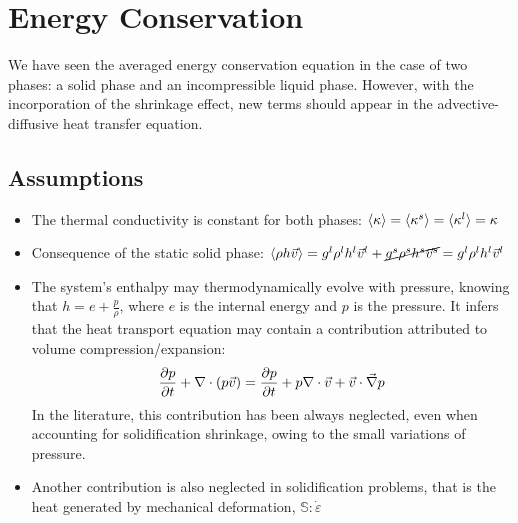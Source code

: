 \section{Energy Conservation}
We have seen the averaged energy conservation equation in the case of two phases: a solid phase and an incompressible liquid phase. However, with the incorporation of the shrinkage effect, new terms should appear
in the advective-diffusive heat transfer equation. 

\subsection{Assumptions}
\begin{itemize}
\item The thermal conductivity is constant for both phases: $\langle \kappa \rangle = \langle \kappa^s \rangle = \langle \kappa^l \rangle= \kappa $ 
\item Consequence of the static solid phase: $\langle \rho h \vec{v} \rangle = {g^l} \rho^l h^l \vec{v}^l +  \cancel{{g^s} \rho^s h^s \vec{v}^s} = {g^l} \rho^l h^l \vec{v}^l$ 
\item The system's enthalpy may thermodynamically evolve with pressure, knowing that $h=e+\frac{p}{\rho}$, where $e$ is the internal energy and $p$ is the pressure. It infers that the heat transport
equation may contain a contribution attributed to volume compression/expansion:
\begin{align}
			 \frac{\partial p}{\partial t}+\nabla \cdot \left( p \vec{v} \right)
			 = \frac{\partial p}{\partial t}+ p \nabla \cdot \vec{v} + \vec{v} \cdot \vec{\nabla} p 
\end{align}
In the literature, this contribution has been always neglected, even when accounting for solidification
shrinkage, owing to the small variations of pressure.
\item Another contribution is also neglected in solidification problems, that is the heat generated by
mechanical deformation, $\mathbb{S}:\dot{\varepsilon}$ 
\end{itemize}

